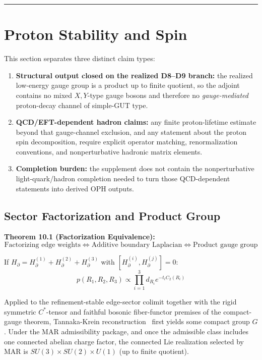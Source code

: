 \begin{center}\rule{0.5\linewidth}{0.5pt}\end{center}

\section{Proton Stability and Spin}\label{10-proton-stability-and-spin}

This section separates three distinct claim types:
\begin{enumerate}
\item \textbf{Structural output closed on the realized D8--D9 branch:} the realized low-energy gauge group is a product up to finite quotient, so the adjoint contains no mixed \(X,Y\)-type gauge bosons and therefore no \emph{gauge-mediated} proton-decay channel of simple-GUT type.
\item \textbf{QCD/EFT-dependent hadron claims:} any finite proton-lifetime estimate beyond that gauge-channel exclusion, and any statement about the proton spin decomposition, require explicit operator matching, renormalization conventions, and nonperturbative hadronic matrix elements.
\item \textbf{Completion burden:} the supplement does not contain the nonperturbative light-quark/hadron completion needed to turn those QCD-dependent statements into derived OPH outputs.
\end{enumerate}

\subsection{Sector Factorization and Product Group}\label{101-sector-factorization-and-product-group}

\textbf{Theorem 10.1 (Factorization Equivalence):} \[\text{Factorizing edge weights} \Leftrightarrow \text{Additive boundary Laplacian} \Leftrightarrow \text{Product gauge group}\]

If \(H_\partial = H_\partial^{(1)} + H_\partial^{(2)} + H_\partial^{(3)}\) with \([H_\partial^{(i)}, H_\partial^{(j)}] = 0\): \[p(R_1, R_2, R_3) \propto \prod_{i=1}^3 d_{R_i} e^{-t_i C_2(R_i)}\]

Applied to the refinement-stable edge-sector colimit together with the rigid symmetric \(C^*\)-tensor and faithful bosonic fiber-functor premises of the compact-gauge theorem, Tannaka-Krein reconstruction~\cite{tannaka38,krein49,dr89,dr90} first yields some compact group \(G\). Under the MAR admissibility package, and once the admissible class includes one connected abelian charge factor, the connected Lie realization selected by MAR is \(SU(3) \times SU(2) \times U(1)\) (up to finite quotient).

